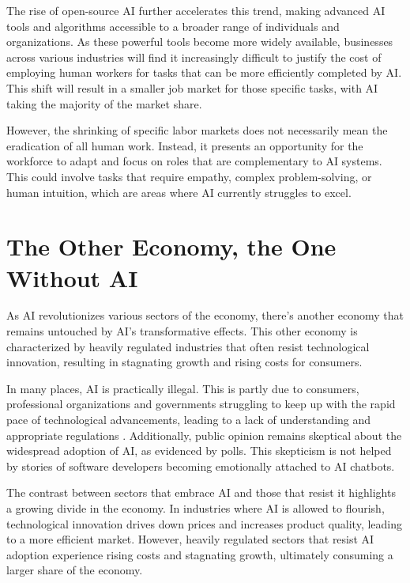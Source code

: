 The rise of open-source AI further accelerates this trend, making advanced AI tools and algorithms accessible to a broader range of individuals and organizations. As these powerful tools become more widely available, businesses across various industries will find it increasingly difficult to justify the cost of employing human workers for tasks that can be more efficiently completed by AI. This shift will result in a smaller job market for those specific tasks, with AI taking the majority of the market share.

However, the shrinking of specific labor markets does not necessarily mean the eradication of all human work. Instead, it presents an opportunity for the workforce to adapt and focus on roles that are complementary to AI systems. This could involve tasks that require empathy, complex problem-solving, or human intuition, which are areas where AI currently struggles to excel.

\section{The Other Economy, the One Without AI}

As AI revolutionizes various sectors of the economy, there's another economy that remains untouched by AI's transformative effects. This other economy is characterized by heavily regulated industries that often resist technological innovation, resulting in stagnating growth and rising costs for consumers.

In many places, AI is practically illegal. This is partly due to consumers, professional organizations and governments struggling to keep up with the rapid pace of technological advancements, leading to a lack of understanding and appropriate regulations . Additionally, public opinion remains skeptical about the widespread adoption of AI, as evidenced by polls. This skepticism is not helped by stories of software developers becoming emotionally attached to AI chatbots.

The contrast between sectors that embrace AI and those that resist it highlights a growing divide in the economy. In industries where AI is allowed to flourish, technological innovation drives down prices and increases product quality, leading to a more efficient market. However, heavily regulated sectors that resist AI adoption experience rising costs and stagnating growth, ultimately consuming a larger share of the economy.

